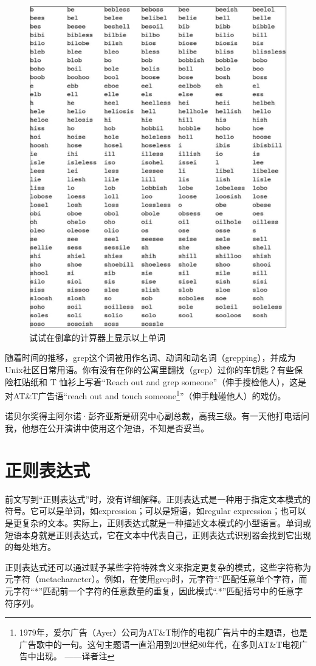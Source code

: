 \documentclass[a4paper,12pt,UTF8,twoside]{ctexbook}
\begin{document}
\begin{figure}[htbp]
	\centering
	\includegraphics[width=0.7\linewidth]{37}
	\caption{试试在倒拿的计算器上显示以上单词}
	\label{fig:1}
\end{figure}

随着时间的推移，grep这个词被用作名词、动词和动名词（grepping），并成为Unix社区日常用语。你有没有在你的公寓里翻找（grep）过你的车钥匙？有些保险杠贴纸和 T 恤衫上写着“Reach out and grep someone”（伸手搜检他人），这是对AT\&T广告语“reach out and touch someone\footnote{1979年，爱尔广告（Ayer）公司为AT\&T制作的电视广告片中的主题语，也是广告歌中的一句。这句主题语一直沿用到20世纪80年代，在多则AT\&T电视广告中出现。 ——译者注}”（伸手触碰他人）的戏仿。

诺贝尔奖得主阿尔诺·彭齐亚斯是研究中心副总裁，高我三级。有一天他打电话问我，他想在公开演讲中使用这个短语，不知是否妥当。

\section{正则表达式}

前文写到“正则表达式”时，没有详细解释。正则表达式是一种用于指定文本模式的符号。它可以是单词，如expression；可以是短语，如regular expression；也可以是更复杂的文本。实际上，正则表达式就是一种描述文本模式的小型语言。单词或短语本身就是正则表达式，它在文本中代表自己，正则表达式识别器会找到它出现的每处地方。

正则表达式还可以通过赋予某些字符特殊含义来指定更复杂的模式，这些字符称为元字符（metacharacter）。例如，在使用grep时，元字符“.”匹配任意单个字符，而元字符“*”匹配前一个字符的任意数量的重复，因此模式“.*”匹配括号中的任意字符序列。
\end{document}
